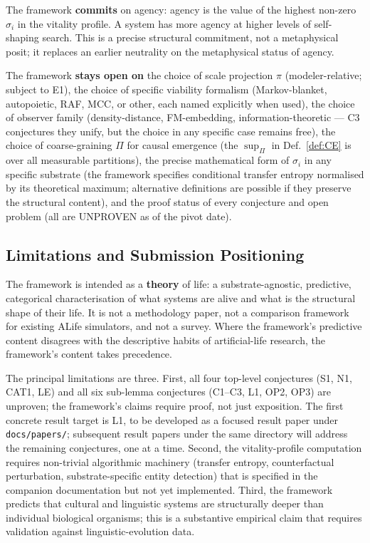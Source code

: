 \documentclass[journal]{IEEEtran}
\theoremstyle{plain}
\theoremstyle{definition}
\theoremstyle{plain}
\begin{document}
The framework \textbf{commits} on agency: agency is the value of the
highest non-zero $\sigma_i$ in the vitality profile. A system has more
agency at higher levels of self-shaping search. This is a precise
structural commitment, not a metaphysical posit; it replaces an
earlier neutrality on the metaphysical status of agency.

The framework \textbf{stays open on} the choice of scale projection
$\pi$ (modeler-relative; subject to E1), the choice of specific
viability formalism (Markov-blanket, autopoietic, RAF, MCC, or other,
each named explicitly when used), the choice of observer family
(density-distance, FM-embedding, information-theoretic --- C3
conjectures they unify, but the choice in any specific case remains
free), the choice of coarse-graining $\Pi$ for causal emergence (the
$\sup_\Pi$ in Def.~\ref{def:CE} is over all measurable partitions),
the precise mathematical form of $\sigma_i$ in any specific substrate
(the framework specifies conditional transfer entropy normalised by
its theoretical maximum; alternative definitions are possible if they
preserve the structural content), and the proof status of every
conjecture and open problem (all are UNPROVEN as of the pivot date).

\subsection{Limitations and Submission Positioning}

The framework is intended as a \textbf{theory} of life: a
substrate-agnostic, predictive, categorical characterisation of what
systems are alive and what is the structural shape of their life. It
is not a methodology paper, not a comparison framework for existing
ALife simulators, and not a survey. Where the framework's predictive
content disagrees with the descriptive habits of artificial-life
research, the framework's content takes precedence.

The principal limitations are three. First, all four top-level
conjectures (S1, N1, CAT1, LE) and all six sub-lemma conjectures
(C1--C3, L1, OP2, OP3) are unproven; the framework's claims require
proof, not just exposition. The first concrete result target is L1,
to be developed as a focused result paper under
\texttt{docs/papers/}; subsequent result papers under the same
directory will address the remaining conjectures, one at a time.
Second, the vitality-profile computation requires non-trivial
algorithmic machinery (transfer entropy, counterfactual perturbation,
substrate-specific entity detection) that is specified in the
companion documentation but not yet implemented. Third, the framework
predicts that cultural and linguistic systems are structurally
deeper than individual biological organisms; this is a substantive
empirical claim that requires validation against linguistic-evolution
data.
\end{document}
